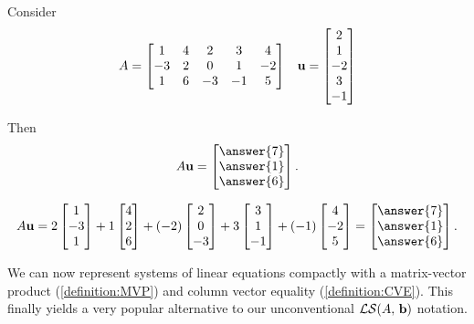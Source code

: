 \documentclass{ximera}
\begin{document}
\begin{example}

  Consider
  \begin{align*}
    A=
    \begin{bmatrix}
      1 & 4 & 2 & 3 & 4\\
      -3 & 2 & 0 & 1 & -2\\
      1 & 6 & -3 & -1 & 5
    \end{bmatrix}
         &&
            \mathbf{u}=\begin{bmatrix}2\\1\\-2\\3\\-1\end{bmatrix}
  \end{align*}
  
  Then
  \[
    A\vect{u}=
    \colvector{\answer{7}\\\answer{1}\\\answer{6}}.
  \]
  \begin{hint}
    \[
      A\vect{u}=
      2\colvector{1\\-3\\1}+
      1\colvector{4\\2\\6}+
      (-2)\colvector{2\\0\\-3}+
      3\colvector{3\\1\\-1}+
      (-1)\colvector{4\\-2\\5}
      =
      \colvector{\answer{7}\\\answer{1}\\\answer{6}}.
    \]
  \end{hint}
\end{example}

We can now represent systems of linear equations compactly with a
matrix-vector product (\ref{definition:MVP}) and column vector
equality (\ref{definition:CVE}).  This finally yields a very popular
alternative to our unconventional $\mathcal{LS}\!\left(A,\,\mathbf{b}\right)$
notation.
\end{document}
